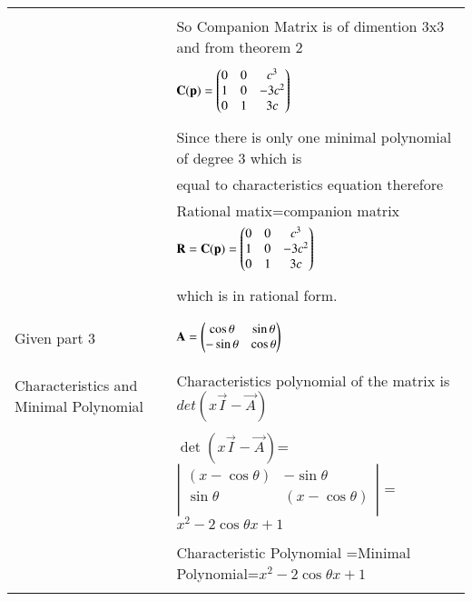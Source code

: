 \begin{longtable}{|l|l|}
&\\
&So Companion Matrix is of dimention 3x3 and from theorem 2\\
&\\
&$\mathbf{C(p)}=\begin{pmatrix}0&0&c^3\\1&0&-3c^2\\0&1&3c\end{pmatrix}$\\
&\\
&Since there is only one minimal polynomial of degree 3 
which is\\ &equal to characteristics equation therefore\\ &Rational matix=companion matrix\\ 
&$\mathbf{R}=\mathbf{C(p)}=\begin{pmatrix}0&0&c^3\\1&0&-3c^2\\0&1&3c\end{pmatrix}$\\
&\\
&which is in rational form.\\
&\\
\hline \hline
\multirow{3}{*}{Given part 3} & \\
&$\mathbf{A}=\begin{pmatrix}\cos\theta&\sin\theta\\-\sin\theta&\cos\theta\end{pmatrix}$\\
&\\
\hline


\multirow{3}{*}{Characteristics and Minimal Polynomial} & \\
&
Characteristics polynomial of the matrix  is $det(x\vec{I}-\vec{A})$\\ 
&\\
& $\det(x\vec{I}-\vec{A})$= $\left|
                \begin{array}{ccc}
                (x-\cos\theta) & -\sin\theta\\
                \sin\theta & (x-\cos\theta)\\
                \end{array} \right|$ =$x^2-2\cos\theta x +1$\\
&\\
& Characteristic Polynomial =Minimal Polynomial=$x^2-2\cos\theta x +1$\\
&\\


\end{longtable}
